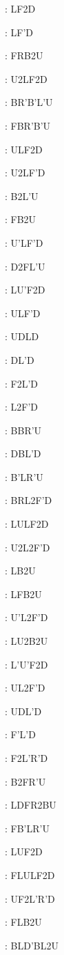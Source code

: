 \documentclass[9pt]{article}
\begin{document}
{\begin{multicols}{6}
: LF2D

: LF'D

: FRB2U

: U2LF2D

: BR'B'L'U

: FBR'B'U

: ULF2D

: U2LF'D

: B2L'U

: FB2U

: U'LF'D

: D2FL'U

: LU'F2D

: ULF'D

: UDLD

: DL'D

: F2L'D

: L2F'D

: BBR'U

: DBL'D

: B'LR'U

: BRL2F'D

: LULF2D

: U2L2F'D

: LB2U

: LFB2U

: U'L2F'D

: LU2B2U

: L'U'F2D

: UL2F'D

: UDL'D

: F'L'D

: F2L'R'D

: B2FR'U

: LDFR2BU

: FB'LR'U

: LUF2D

: FLULF2D

: UF2L'R'D

: FLB2U

: BLD'BL2U


\end{multicols}}
\end{document}
